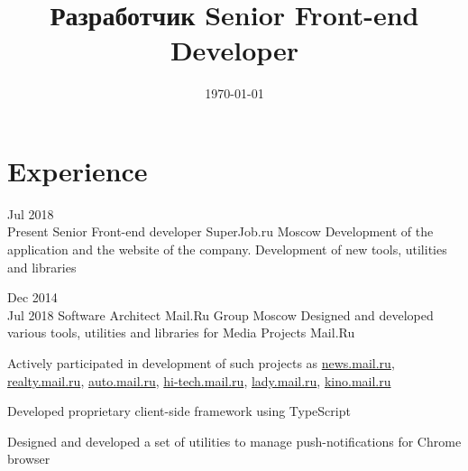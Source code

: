 \documentclass[11pt,a4paper,sans]{moderncv}
\title
    {\lang
        {Разработчик}
        {Senior Front-end Developer}}
\date{\today}
\newcommand{\lang}[2]{#2}
\begin{document}
\makecvtitle

\section
    {\lang
        {Опыт работы}
        {Experience}}

\cventry
    {\lang{Июл}{Jul} 2018\\\lang{по н.в.}{Present}}
    {\lang
        {Фронтенд разработчик}
        {Senior Front-end developer}}
    {SuperJob.ru}
    {\lang
        {Москва}
        {Moscow}}
    {}
    {\lang
        {Разработка и поддержка сайта компании, создание новых инструментов, утилит и библиотек}
        {Development of the application and the website of the company. Development of new tools, utilities and libraries}\\}


\cventry
    {\lang{Дек}{Dec} 2014\\\lang{Июл}{Jul} 2018}
    {\lang
        {Архитектор программного обеспечения}
        {Software Architect}}
    {Mail.Ru Group}
    {\lang
        {Москва}
        {Moscow}}
    {}
    {\lang
        {Занимаюсь проектированием и разработкой инструментов, утилит и библиотек в медиапроектах Mail.Ru.}
        {Designed and developed various tools, utilities and libraries for Media Projects Mail.Ru}}

\cvlistitem
    {\lang
        {Принимал участие в разработке проектов \href{https://news.mail.ru}{news.mail.ru}, \href{https://realty.mail.ru}{realty.mail.ru}, \href{https://auto.mail.ru}{auto.mail.ru}, \href{https://hi-tech.mail.ru}{hi-tech.mail.ru}, \href{https://lady.mail.ru}{lady.mail.ru}, \href{https://kino.mail.ru}{kino.mail.ru}}
        {Actively participated in development of such projects as \href{https://news.mail.ru}{news.mail.ru}, \href{https://realty.mail.ru}{realty.mail.ru}, \href{https://auto.mail.ru}{auto.mail.ru}, \href{https://hi-tech.mail.ru}{hi-tech.mail.ru}, \href{https://lady.mail.ru}{lady.mail.ru}, \href{https://kino.mail.ru}{kino.mail.ru}}}

\cvlistitem
    {\lang
        {Разработал фреймворк для создания клиентских приложений с использованием языка TypeScript}
        {Developed proprietary client-side framework using TypeScript}}

\cvlistitem
    {\lang
        {TODO}
        {Designed and developed a set of utilities to manage push-notifications for Chrome browser}\\}
\end{document}
